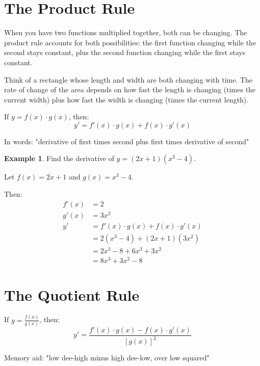 \documentclass[12pt,a4paper]{book}
\theoremstyle{definition}
\newtheorem{example}{Example}[chapter]
\begin{document}
\section{The Product Rule}

\begin{intuition}
When you have two functions multiplied together, both can be changing. The product rule accounts for both possibilities: the first function changing while the second stays constant, plus the second function changing while the first stays constant.

Think of a rectangle whose length and width are both changing with time. The rate of change of the area depends on how fast the length is changing (times the current width) plus how fast the width is changing (times the current length).
\end{intuition}

\begin{keyformula}
If $y = f(x) \cdot g(x)$, then:
$$y' = f'(x) \cdot g(x) + f(x) \cdot g'(x)$$

In words: "derivative of first times second plus first times derivative of second"
\end{keyformula}

\begin{example}
Find the derivative of $y = (2x + 1)(x^3 - 4)$.

Let $f(x) = 2x + 1$ and $g(x) = x^3 - 4$.

Then:
\begin{align}
f'(x) &= 2\\
g'(x) &= 3x^2\\
y' &= f'(x) \cdot g(x) + f(x) \cdot g'(x)\\
&= 2(x^3 - 4) + (2x + 1)(3x^2)\\
&= 2x^3 - 8 + 6x^3 + 3x^2\\
&= 8x^3 + 3x^2 - 8
\end{align}
\end{example}

\section{The Quotient Rule}

\begin{keyformula}
If $y = \frac{f(x)}{g(x)}$, then:
$$y' = \frac{f'(x) \cdot g(x) - f(x) \cdot g'(x)}{[g(x)]^2}$$

Memory aid: "low dee-high minus high dee-low, over low squared"
\end{keyformula}
\end{document}
